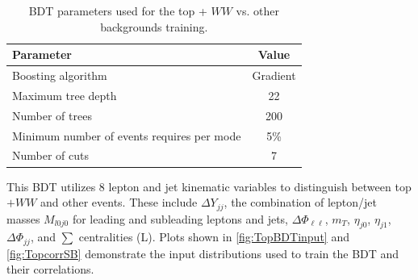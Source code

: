 \begin{table}[h!]
\centering
\begin{tabular}{|l|c|}
\hline
Parameter                                    & Value     \\
\hline
Boosting algorithm                           &  Gradient  \\
Maximum tree depth                           &  22       \\
Number of trees                              &  200     \\
Minimum number of events requires per mode   &  5\%      \\
Number of cuts                               &  7        \\
\hline
\end{tabular}
\caption{BDT parameters used for the top + $WW$ vs. other backgrounds training.} 
\label{tab:TopBDTparameters}
\end{table}

This BDT utilizes 8 lepton and jet kinematic variables to distinguish between top$+WW$ and other events. These include $\Delta Y_{jj}$, the combination of lepton/jet masses $M_{l0j0}$ for leading and subleading leptons and jets, $\Delta \Phi_{\ell\ell}$, $m_T$, $\eta_{j0}$, $\eta_{j1}$, $\Delta \Phi_{jj}$, and $\sum$ centralities (L). Plots shown in \ref{fig:TopBDTinput} and \ref{fig:TopcorrSB} demonstrate the input distributions used to train the BDT and their correlations.

